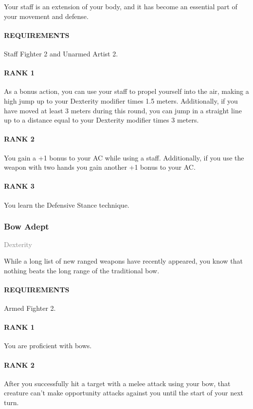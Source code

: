 \normalsize
Your staff is an extension of your body, and it has become an essential part of your movement and defense.
\paragraph{REQUIREMENTS} Staff Fighter 2 and Unarmed Artist 2.
\paragraph{RANK 1} As a bonus action, you can use your staff to propel yourself into the air, making a high jump up to your Dexterity modifier times 1.5 meters.
Additionally, if you have moved at least 3 meters during this round, you can jump in a straight line up to a distance equal to your Dexterity modifier times 3 meters.
\paragraph{RANK 2} You gain a +1 bonus to your AC while using a staff.
Additionally, if you use the weapon with two hands you gain another +1 bonus to your AC.
\paragraph{RANK 3} You learn the Defensive Stance technique.

\subsubsection{Bow Adept} \label{feat::bowadept}
\small{\textcolor{gray}{Dexterity}}

\normalsize
While a long list of new ranged weapons have recently appeared, you know that nothing beats the long range of the traditional bow.
\paragraph{REQUIREMENTS} Armed Fighter 2.
\paragraph{RANK 1} You are proficient with bows.
\paragraph{RANK 2} After you successfully hit a target with a melee attack using your bow, that creature can't make opportunity attacks against you until the start of your next turn.
